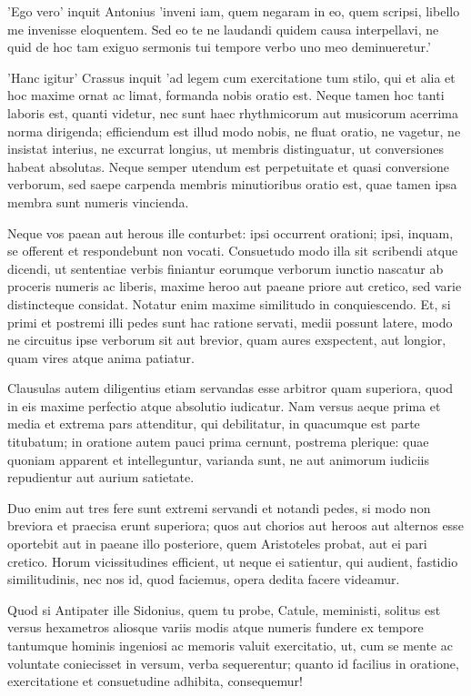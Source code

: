  'Ego vero' inquit Antonius 'inveni iam, quem negaram in eo, quem scripsi, libello me invenisse eloquentem. Sed eo te ne laudandi quidem causa interpellavi, ne quid de hoc tam exiguo sermonis tui tempore verbo uno meo deminueretur.'

 'Hanc igitur' Crassus inquit 'ad legem cum exercitatione tum stilo, qui et alia et hoc maxime ornat ac limat, formanda nobis oratio est. Neque tamen hoc tanti laboris est, quanti videtur, nec sunt haec rhythmicorum aut musicorum acerrima norma dirigenda; efficiendum est illud modo nobis, ne fluat oratio, ne vagetur, ne insistat interius, ne excurrat longius, ut membris distinguatur, ut conversiones habeat absolutas. Neque semper utendum est perpetuitate et quasi conversione verborum, sed saepe carpenda membris minutioribus oratio est, quae tamen ipsa membra sunt numeris vincienda.

 Neque vos paean aut herous ille conturbet: ipsi occurrent orationi; ipsi, inquam, se offerent et respondebunt non vocati. Consuetudo modo illa sit scribendi atque dicendi, ut sententiae verbis finiantur eorumque verborum iunctio nascatur ab proceris numeris ac liberis, maxime heroo aut paeane priore aut cretico, sed varie distincteque considat. Notatur enim maxime similitudo in conquiescendo. Et, si primi et postremi illi pedes sunt hac ratione servati, medii possunt latere, modo ne circuitus ipse verborum sit aut brevior, quam aures exspectent, aut longior, quam vires atque anima patiatur.

 Clausulas autem diligentius etiam servandas esse arbitror quam superiora, quod in eis maxime perfectio atque absolutio iudicatur. Nam versus aeque prima et media et extrema pars attenditur, qui debilitatur, in quacumque est parte titubatum; in oratione autem pauci prima cernunt, postrema plerique: quae quoniam apparent et intelleguntur, varianda sunt, ne aut animorum iudiciis repudientur aut aurium satietate.

 Duo enim aut tres fere sunt extremi servandi et notandi pedes, si modo non breviora et praecisa erunt superiora; quos aut chorios aut heroos aut alternos esse oportebit aut in paeane illo posteriore, quem Aristoteles probat, aut ei pari cretico. Horum vicissitudines efficient, ut neque ei satientur, qui audient, fastidio similitudinis, nec nos id, quod faciemus, opera dedita facere videamur.

 Quod si Antipater ille Sidonius, quem tu probe, Catule, meministi, solitus est versus hexametros aliosque variis modis atque numeris fundere ex tempore tantumque hominis ingeniosi ac memoris valuit exercitatio, ut, cum se mente ac voluntate coniecisset in versum, verba sequerentur; quanto id facilius in oratione, exercitatione et consuetudine adhibita, consequemur!


